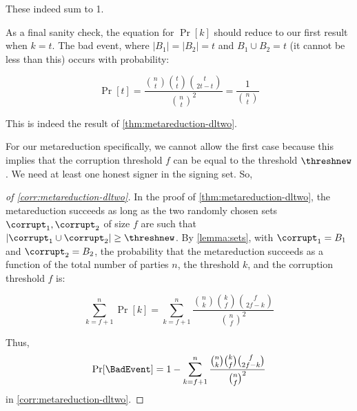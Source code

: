 These indeed sum to 1.

As a final sanity check, the equation for $\Pr[k]$ should reduce to our first result when $k = t$.
%
%
%
The bad event, where $\lvert B_1 \rvert = \lvert B_2 \rvert = t$ and $B_1 \cup B_2 = t$ (it cannot be less than this) occurs with probability:

\begin{equation}
\Pr[t] =
      \frac{\binom{n}{t} \binom{t}{t} \binom{t}{2t - t}}{\binom{n}{t}^2} = \frac{1}{\binom{n}{t}}
  \end{equation}

This is indeed the result of \cref{thm:metareduction-dltwo}.

For our metareduction specifically, we cannot allow the first case because this implies that the corruption threshold $f$ can be equal to the threshold $\threshnew$. We need at least one honest signer in the signing set.
So, 

\begin{proof}[of \cref{corr:metareduction-dltwo}]
In the proof of  \cref{thm:metareduction-dltwo}, the metareduction succeeds as long as the two randomly chosen sets $\corrupt_1, \corrupt_2$ of size $f$  are such that $\lvert \corrupt_1 \cup \corrupt_2 \rvert \geq \threshnew$.
By \cref{lemma:sets}, with $\corrupt_1 = B_1$ and $\corrupt_2 = B_2$, the probability that the metareduction succeeds as a function of the total number of parties $n$, the threshold $k$, and the corruption threshold $f$ is:

$$\sum_{k = f +1}^n \Pr[k] = \sum_{k = f +1}^n \frac{\binom{n}{k} \binom{k}{f} \binom{f}{2f - k}}{\binom{n}{f}^2}$$

Thus, $$\Pr[\BadEvent] = 1 - \sum_{k = f +1}^n \frac{\binom{n}{k} \binom{k}{f} \binom{f}{2f - k}}{\binom{n}{f}^2}$$
in \cref{corr:metareduction-dltwo}.

\end{proof}
